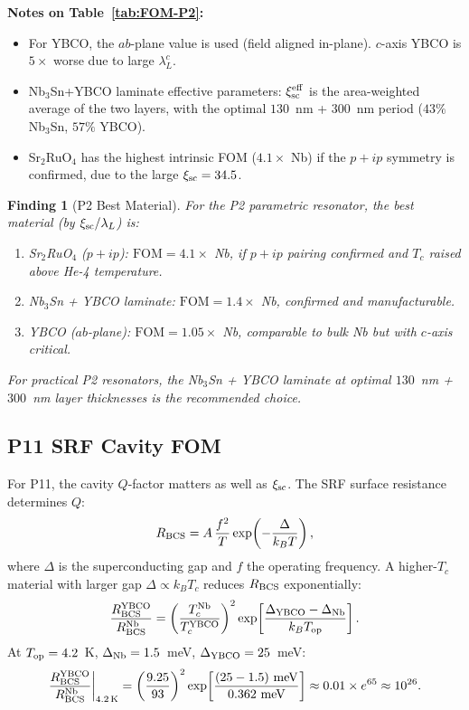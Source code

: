 \documentclass[11pt]{article}
\newtheorem{finding}{Finding}
\begin{document}
\textbf{Notes on Table~\ref{tab:FOM-P2}:}
\begin{itemize}
  \item For YBCO, the $ab$-plane value is used (field aligned in-plane).
        $c$-axis YBCO is $5\times$ worse due to large $\lambda_L^c$.
  \item Nb$_3$Sn+YBCO laminate effective parameters: $\xi_{\rm sc}^{\rm eff}$
        is the area-weighted average of the two layers, with the optimal
        $130$~nm + $300$~nm period ($43\%$ Nb$_3$Sn, $57\%$ YBCO).
  \item Sr$_2$RuO$_4$ has the highest intrinsic FOM ($4.1\times$ Nb) if
        the $p+ip$ symmetry is confirmed, due to the large $\xi_{\rm sc} = 34.5$.
\end{itemize}

\begin{finding}[P2 Best Material]
\label{finding:FOM-P2}
For the P2 parametric resonator, the best material (by $\xi_{\rm sc}/\lambda_L$)
is:
\begin{enumerate}
  \item Sr$_2$RuO$_4$ ($p+ip$): $\text{FOM} = 4.1\times$ Nb, \emph{if} $p+ip$
        pairing confirmed and $T_c$ raised above He-4 temperature.
  \item Nb$_3$Sn + YBCO laminate: $\text{FOM} = 1.4\times$ Nb, \emph{confirmed}
        and manufacturable.
  \item YBCO ($ab$-plane): $\text{FOM} = 1.05\times$ Nb, comparable to
        bulk Nb but with $c$-axis critical.
\end{enumerate}
For practical P2 resonators, the Nb$_3$Sn + YBCO laminate at optimal
$130$~nm + $300$~nm layer thicknesses is the recommended choice.
\end{finding}

\subsection{P11 SRF Cavity FOM}

For P11, the cavity $Q$-factor matters as well as $\xi_{\rm sc}$.
The SRF surface resistance determines $Q$:
\begin{equation}
R_{\rm BCS} = A\,\frac{f^2}{T}\exp\!\left(-\frac{\Delta}{k_B T}\right),
\label{eq:R-BCS}
\end{equation}
where $\Delta$ is the superconducting gap and $f$ the operating frequency.
A higher-$T_c$ material with larger gap $\Delta \propto k_B T_c$ reduces
$R_{\rm BCS}$ exponentially:
\begin{equation}
\frac{R_{\rm BCS}^{\rm YBCO}}{R_{\rm BCS}^{\rm Nb}}
= \left(\frac{T_c^{\rm Nb}}{T_c^{\rm YBCO}}\right)^2
  \exp\!\left[\frac{\Delta_{\rm YBCO} - \Delta_{\rm Nb}}{k_B T_{\rm op}}\right].
\label{eq:R-ratio}
\end{equation}
At $T_{\rm op} = 4.2$~K, $\Delta_{\rm Nb} = 1.5$~meV, $\Delta_{\rm YBCO} = 25$~meV:
\begin{equation}
\frac{R_{\rm BCS}^{\rm YBCO}}{R_{\rm BCS}^{\rm Nb}}\bigg|_{4.2\,\rm K}
= \left(\frac{9.25}{93}\right)^2 \exp\!\left[\frac{(25-1.5)\text{ meV}}{0.362\text{ meV}}\right]
\approx 0.01 \times e^{65} \approx 10^{26}.
\label{eq:R-ratio-num}
\end{equation}
\end{document}
